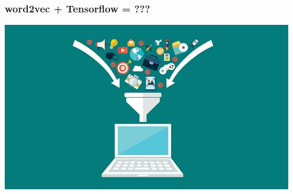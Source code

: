 \documentclass[aspectratio=43,x11names]{beamer}
\begin{document}
\begin{frame}
\frametitle{word2vec + Tensorflow = ???}
\begin{center}
\includegraphics[width=0.95\textwidth]{images/funnel} 
\end{center}
\end{frame}
\end{document}
